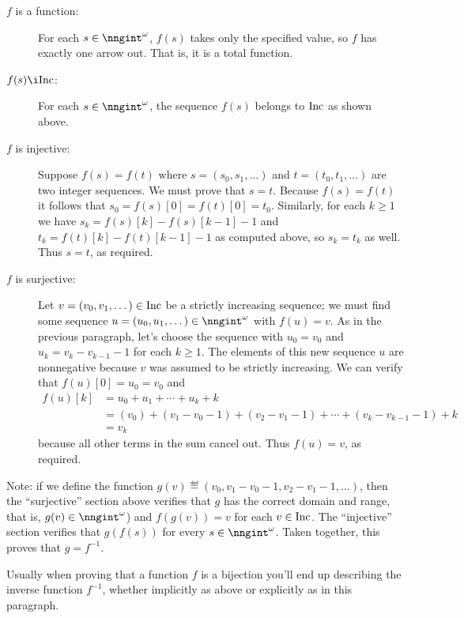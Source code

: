 \begin{problem}
\begin{solution}
\begin{description}
\item[\boldmath $f$ is a function:] For each $s\in\nngint^\omega$,
  $f(s)$ takes only the specified value, so $f$ has exactly one arrow
  out.  That is, it is a total function.
      
\item[\boldmath $f(s) \i \Inc$:] For each $s\in\nngint^\omega$, the
  sequence $f(s)$ belongs to $\text{Inc}$ as shown above.
      
\item[\boldmath $f$ is injective:] Suppose $f(s) = f(t)$ where
  $s=(s_0,s_1,\dots)$ and $t=(t_0,t_1,\dots)$ are two integer
  sequences.  We must prove that $s = t$. Because $f(s) = f(t)$ it
  follows that $s_0 = f(s)[0] = f(t)[0] = t_0$.  Similarly, for each $k
  \ge 1$ we have $s_{k} = f(s)[k]-f(s)[k-1] - 1$ and $t_{k} =
  f(t)[k]-f(t)[k-1] - 1$ as computed above, so $s_k = t_k$ as
  well.  Thus $s=t$, as required.
      
\item[\boldmath $f$ is surjective:] Let $v = (v_0,v_1,\dots) \in
  \text{Inc}$ be a strictly increasing sequence; we must find some
  sequence $u = (u_0,u_1,\dots)\in\nngint^\omega$ with $f(u) =
  v$.  As in the previous paragraph, let's choose the sequence with
  $u_0 = v_0$ and $u_{k} = v_{k} - v_{k-1} - 1$ for each $k \ge
  1$.  The elements of this new sequence $u$ are nonnegative
  because $v$ was assumed to be strictly increasing.  We can verify
  that $f(u)[0] = u_0 = v_0$ and
\begin{align*}
f(u)[k]
& = u_0 + u_1 + \cdots + u_k + k \\
& = (v_0) + (v_1 - v_0 - 1) + (v_2 - v_1 - 1) + \cdots + (v_k - v_{k-1}-1) + k \\
& = v_k
  \end{align*}
because all other terms in the sum cancel out.  Thus $f(u) = v$, as required.      
\end{description}
    
Note: if we define the function $g(v) \eqdef (v_0, v_1-v_0-1,
v_2-v_1-1,\dots)$, then the ``surjective'' section above verifies
that $g$ has the correct domain and range, that is,
$g(v)\in\nngint^\omega$) and $f(g(v)) = v$ for each $v\in \text{Inc}$.
The ``injective'' section verifies that $g(f(s))$ for every
$s\in\nngint^\omega$.  Taken together, this proves that $g =
f^{-1}$.

Usually when proving that a function $f$ is a bijection you'll end up
describing the inverse function $f^{-1}$, whether implicitly as above
or explicitly as in this paragraph.
\end{solution}

\end{problem}



\endinput
